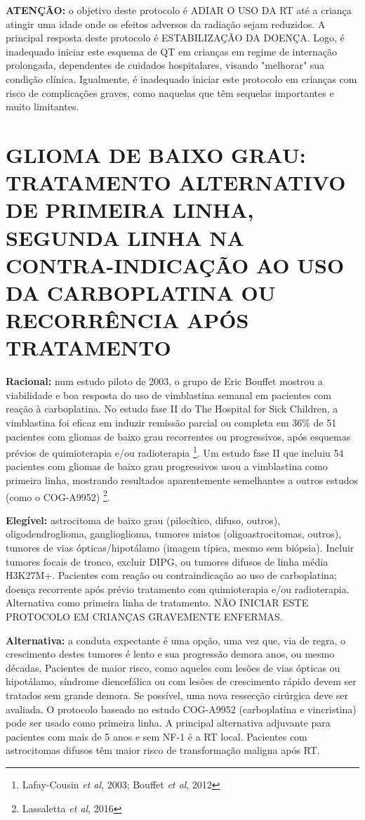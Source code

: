 \documentclass[11pt,a4paper,oldfontcommands]{memoir}
\begin{document}
\textbf{ATENÇÃO:} o objetivo deste protocolo é ADIAR O USO DA RT até a criança atingir uma idade onde os efeitos adversos da radiação sejam reduzidos. A principal resposta deste protocolo é ESTABILIZAÇÃO DA DOENÇA. Logo, é inadequado iniciar este esquema de QT em crianças em regime de internação prolongada, dependentes de cuidados hospitalares, visando "melhorar" sua condição clínica. Igualmente, é inadequado iniciar este protocolo em crianças com risco de complicações graves, como naquelas que têm sequelas importantes e muito limitantes.

\cleardoublepage

\section{GLIOMA DE BAIXO GRAU: TRATAMENTO ALTERNATIVO DE PRIMEIRA LINHA, SEGUNDA LINHA NA CONTRA-INDICAÇÃO AO USO DA CARBOPLATINA OU RECORRÊNCIA APÓS TRATAMENTO}
{\let\thefootnote\relax{}}
\textbf{Racional:} num estudo piloto de 2003, o grupo de Eric Bouffet mostrou a viabilidade e boa resposta do uso de vimblastina semanal em pacientes com reação à carboplatina. No estudo fase II do The Hospital for Sick Children, a vimblastina foi eficaz em induzir remissão parcial ou completa em 36\% de 51 pacientes com gliomas de baixo grau recorrentes ou progressivos, após esquemas prévios de quimioterapia e/ou radioterapia \footnote{Lafay-Cousin \textit{et al}, 2003; Bouffet \textit{et al}, 2012}. Um estudo fase II que incluiu 54 pacientes com gliomas de baixo grau progressivos usou a vimblastina como primeira linha, mostrando resultados aparentemente semelhantes a outros estudos (como o COG-A9952) \footnote{Lassaletta \textit{et al}, 2016}.

\textbf{Elegível:} astrocitoma de baixo grau (pilocítico, difuso, outros), oligodendroglioma, ganglioglioma, tumores mistos (oligoastrocitomas, outros), tumores de vias ópticas/hipotálamo (imagem típica, mesmo sem biópsia). Incluir tumores focais de tronco, excluir DIPG, ou tumores difusos de linha média H3K27M+. Pacientes com reação ou contraindicação ao uso de carboplatina; doença recorrente após prévio tratamento com quimioterapia e/ou radioterapia. Alternativa como primeira linha de tratamento. NÃO INICIAR ESTE PROTOCOLO EM CRIANÇAS GRAVEMENTE ENFERMAS.

\textbf{Alternativa:} a conduta expectante é uma opção, uma vez que, via de regra, o crescimento destes tumores é lento e sua progressão demora anos, ou mesmo décadas. Pacientes de maior risco, como aqueles com lesões de vias ópticas ou hipotálamo, síndrome diencefálica ou com lesões de crescimento rápido devem ser tratados sem grande demora. Se possível, uma nova ressecção cirúrgica deve ser avaliada. O protocolo baseado no estudo COG-A9952 (carboplatina e vincristina) pode ser usado como primeira linha. A principal alternativa adjuvante para pacientes com mais de 5 anos e sem NF-1 é a RT local. Pacientes com astrocitomas difusos têm maior risco de transformação maligna após RT.
\end{document}
